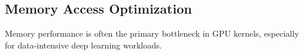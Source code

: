 \subsection{Memory Access Optimization}

Memory performance is often the primary bottleneck in GPU kernels, especially for data-intensive deep learning workloads.


